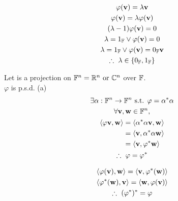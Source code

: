 \documentclass{mathtoolkit}
\begin{document}
\begin{p}
  \item
    \begin{subp}
      \item
        \begin{gather*}
          \varphi(\vec{v}) = \lambda \vec{v} \\
          \varphi(\vec{v}) = \lambda \varphi(\vec{v}) \\
          (\lambda - 1) \varphi(\vec{v}) = 0 \\
          \lambda = 1_\field{F} \vee \varphi(\vec{v}) = 0 \\
          \lambda = 1_\field{F} \vee \varphi(\vec{v}) = 0_\field{F} \vec{v} \\
          \therefore \lambda \in \left\{ 0_\field{F}, 1_\field{F} \right\}
        \end{gather*}

      \item
        Let \varphi is a projection on $\field{F}^n = \field{R}^n \text{or} \field{C}^n$
        over $\mathbb{F}$. \\
        $\varphi$ is p.s.d. \because (a) \\
        \begin{gather*}
          \exists \alpha : \field{F}^n \rightarrow \field{F}^n \st \varphi = \alpha^* \alpha \\
          \forall \vec{v}, \vec{w} \in \field{F}^n, \\
          \begin{aligned}
            \ip{\varphi \vec{v}}{\vec{w}} & = \ip{\alpha^*\alpha\vec{v}}{\vec{w}} \\
                                          & = \ip{\vec{v}}{\alpha^*\alpha\vec{w}} \\
                                          & = \ip{\vec{v}}{\varphi^*\vec{w}}
          \end{aligned} \\
          \therefore \varphi = \varphi^*
        \end{gather*}
    \end{subp}

  \item
    \begin{subp}
      \item
        \begin{gather*}
          \ip{\varphi(\vec{v})}{\vec{w}} = \ip{\vec{v}}{\varphi^*(\vec{w})} \\
          \ip{\varphi^*(\vec{w})}{\vec{v}} = \ip{\vec{w}}{\varphi(\vec{v})} \\
          \therefore (\varphi^*)^* = \varphi
        \end{gather*}


\end{subp}
\end{p}
\end{document}
